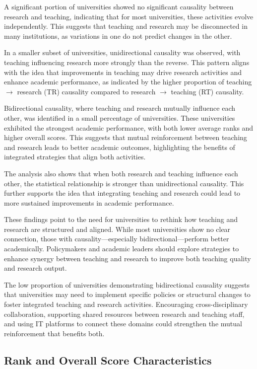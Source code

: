 \documentclass[conference]{IEEEtran}
\begin{document}
A significant portion of universities showed no significant causality between research and teaching, indicating that for most universities, these activities evolve independently. This suggests that teaching and research may be disconnected in many institutions, as variations in one do not predict changes in the other.

In a smaller subset of universities, unidirectional causality was observed, with teaching influencing research more strongly than the reverse. This pattern aligns with the idea that improvements in teaching may drive research activities and enhance academic performance, as indicated by the higher proportion of teaching $\rightarrow$ research (TR) causality compared to research $\rightarrow$ teaching (RT) causality.

Bidirectional causality, where teaching and research mutually influence each other, was identified in a small percentage of universities. These universities exhibited the strongest academic performance, with both lower average ranks and higher overall scores. This suggests that mutual reinforcement between teaching and research leads to better academic outcomes, highlighting the benefits of integrated strategies that align both activities.

The analysis also shows that when both research and teaching influence each other, the statistical relationship is stronger than unidirectional causality. This further supports the idea that integrating teaching and research could lead to more sustained improvements in academic performance.

These findings point to the need for universities to rethink how teaching and research are structured and aligned. While most universities show no clear connection, those with causality—especially bidirectional—perform better academically. Policymakers and academic leaders should explore strategies to enhance synergy between teaching and research to improve both teaching quality and research output.

The low proportion of universities demonstrating bidirectional causality suggests that universities may need to implement specific policies or structural changes to foster integrated teaching and research activities. Encouraging cross-disciplinary collaboration, supporting shared resources between research and teaching staff, and using IT platforms to connect these domains could strengthen the mutual reinforcement that benefits both.


\subsection{Rank and Overall Score Characteristics}
\end{document}
